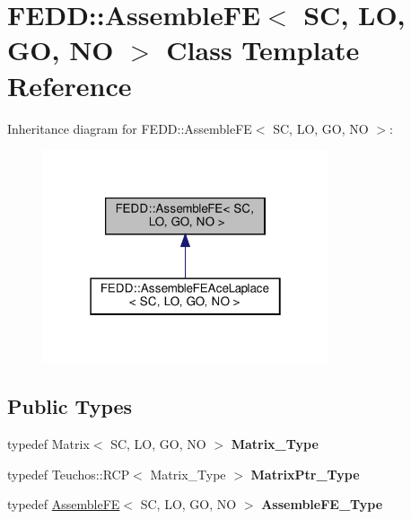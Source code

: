 \hypertarget{classFEDD_1_1AssembleFE}{}\section{F\+E\+DD\+:\+:Assemble\+FE$<$ SC, LO, GO, NO $>$ Class Template Reference}
\label{classFEDD_1_1AssembleFE}


Inheritance diagram for F\+E\+DD\+:\+:Assemble\+FE$<$ SC, LO, GO, NO $>$\+:\nopagebreak
\begin{figure}[H]
\begin{center}
\leavevmode
\includegraphics[width=238pt]{classFEDD_1_1AssembleFE__inherit__graph}
\end{center}
\end{figure}
\subsection*{Public Types}
\begin{DoxyCompactItemize}
\item 
\mbox{\label{classFEDD_1_1AssembleFE_a45f9f1ceeab511de82617cdbf61f58b2}} 
typedef Matrix$<$ SC, LO, GO, NO $>$ {\bfseries Matrix\+\_\+\+Type}
\item 
\mbox{\label{classFEDD_1_1AssembleFE_a2c09e302d672917051e08717a0bc3b57}} 
typedef Teuchos\+::\+R\+CP$<$ Matrix\+\_\+\+Type $>$ {\bfseries Matrix\+Ptr\+\_\+\+Type}
\item 
\mbox{\label{classFEDD_1_1AssembleFE_ab2c8bb1fd65dfcf7899a7c4a4a8a4021}} 
typedef \hyperlink{classFEDD_1_1AssembleFE}{Assemble\+FE}$<$ SC, LO, GO, NO $>$ {\bfseries Assemble\+F\+E\+\_\+\+Type}
\end{DoxyCompactItemize}
